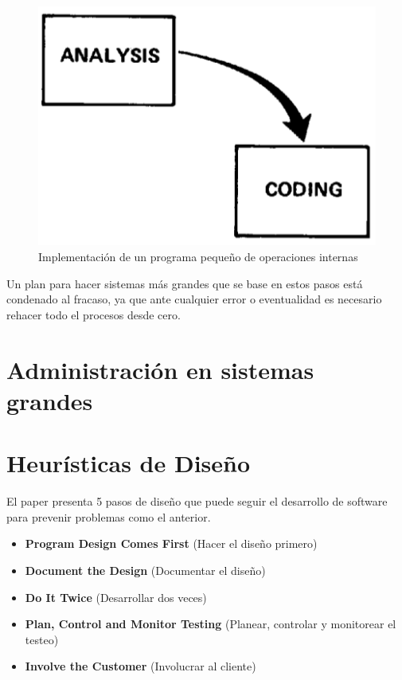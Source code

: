 \documentclass{beamer}
\begin{document}
\begin{frame}[fragile]

\begin{figure}[h]
\includegraphics[width=.3\textwidth]{figures/small.png}

\caption{Implementación de un programa pequeño de operaciones internas}
{}
\end{figure}

\vspace{-1em}

Un plan para hacer sistemas más grandes que se base en estos pasos está condenado al fracaso, ya que ante cualquier error o eventualidad es necesario rehacer todo el procesos desde cero.


\end{frame}

\section{Administración en sistemas grandes}

\section{Heurísticas de Diseño}

\begin{frame}
El paper presenta 5 pasos de diseño que puede seguir el desarrollo de software para prevenir problemas como el anterior.

\begin{itemize}
\item<2-> \textbf{Program Design Comes First} (Hacer el diseño primero)
\item<3-> \textbf{Document the Design} (Documentar el diseño)
\item<4-> \textbf{Do It Twice} (Desarrollar dos veces)
\item<5-> \textbf{Plan, Control and Monitor Testing} (Planear, controlar y monitorear el testeo)
\item<6-> \textbf{Involve the Customer} (Involucrar al cliente)
\end{itemize}

\end{frame}
\end{document}
